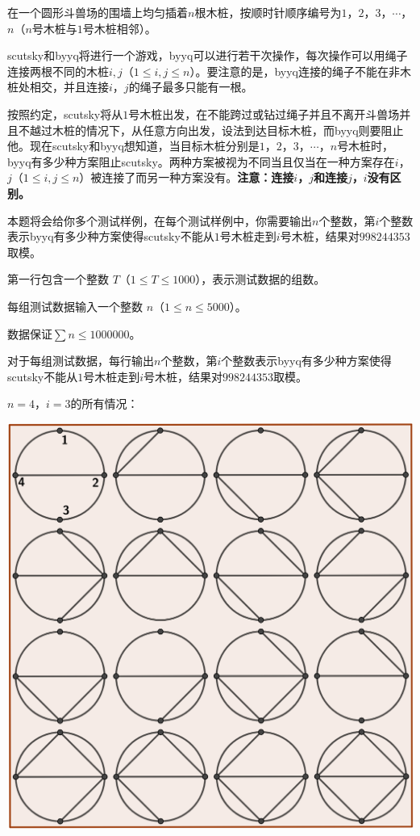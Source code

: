
在一个圆形斗兽场的围墙上均匀插着$n$根木桩，按顺时针顺序编号为$1$，$2$，$3$，$\cdots$，$n$（$n$号木桩与$1$号木桩相邻）。

scutsky和byyq将进行一个游戏，byyq可以进行若干次操作，每次操作可以用绳子连接两根不同的木桩$i,j$（$1\leqslant i,j\leqslant n$）。要注意的是，byyq连接的绳子不能在非木桩处相交，并且连接$i$，$j$的绳子最多只能有一根。

按照约定，scutsky将从$1$号木桩出发，在不能跨过或钻过绳子并且不离开斗兽场并且不越过木桩的情况下，从任意方向出发，设法到达目标木桩，而byyq则要阻止他。现在scutsky和byyq想知道，当目标木桩分别是$1$，$2$，$3$，$\cdots$，$n$号木桩时，byyq有多少种方案阻止scutsky。两种方案被视为不同当且仅当在一种方案存在$i$，$j$（$1\leqslant i,j\leqslant n$）被连接了而另一种方案没有。\textbf{注意：连接$i$，$j$和连接$j$，$i$没有区别。}

本题将会给你多个测试样例，在每个测试样例中，你需要输出$n$个整数，第$i$个整数表示byyq有多少种方案使得scutsky不能从$1$号木桩走到$i$号木桩，结果对$998244353$取模。


第一行包含一个整数 $T$（$1\leqslant T \leqslant 1000$），表示测试数据的组数。

每组测试数据输入一个整数 $n$（$1 \leqslant n \leqslant 5000$）。

数据保证$\sum n\leqslant 1000000$。


对于每组测试数据，每行输出$n$个整数，第$i$个整数表示byyq有多少种方案使得scutsky不能从$1$号木桩走到$i$号木桩，结果对$998244353$取模。



$n=4$，$i=3$的所有情况：

\includegraphics[width=.5\linewidth]{image2.png}
